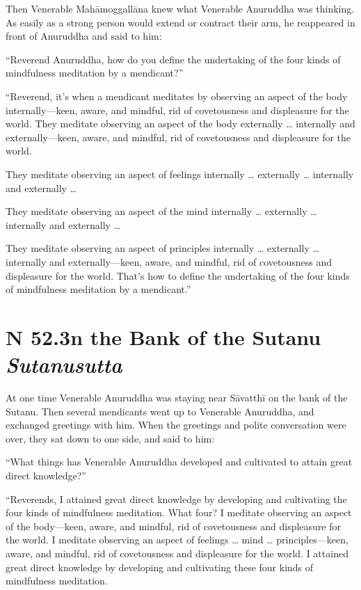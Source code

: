 \documentclass[12pt,openany]{book}%
\newcommand*{\suttatitleacronym}[1]{\smaller[2]{#1}\vspace*{.3em}}
\newcommand*{\suttatitletranslation}[1]{\linebreak{#1}}
\newcommand*{\suttatitleroot}[1]{\linebreak\smaller[2]\itshape{#1}}
\newcommand*{\tocacronym}[1]{\hspace*{-3.3em}{#1}\quad}
\newcommand*{\toctranslation}[1]{#1}
\newcommand*{\tocroot}[1]{(\textit{#1})}
\begin{document}
Then Venerable \textsanskrit{Mahāmoggallāna} knew what Venerable Anuruddha was thinking. As easily as a strong person would extend or contract their arm, he reappeared in front of Anuruddha and said to him: 

“Reverend Anuruddha, how do you define the undertaking of the four kinds of mindfulness meditation by a mendicant?” 

“Reverend, it’s when a mendicant meditates by observing an aspect of the body internally—keen, aware, and mindful, rid of covetousness and displeasure for the world. They meditate observing an aspect of the body externally … internally and externally—keen, aware, and mindful, rid of covetousness and displeasure for the world. 

They meditate observing an aspect of feelings internally … externally … internally and externally … 

They meditate observing an aspect of the mind internally … externally … internally and externally … 

They meditate observing an aspect of principles internally … externally … internally and externally—keen, aware, and mindful, rid of covetousness and displeasure for the world. That’s how to define the undertaking of the four kinds of mindfulness meditation by a mendicant.” 

%
\section*{{\suttatitleacronym SN 52.3}{\suttatitletranslation On the Bank of the Sutanu }{\suttatitleroot Sutanusutta}}
\addcontentsline{toc}{section}{\tocacronym{SN 52.3} \toctranslation{On the Bank of the Sutanu } \tocroot{Sutanusutta}}

At one time Venerable Anuruddha was staying near \textsanskrit{Sāvatthī} on the bank of the Sutanu. Then several mendicants went up to Venerable Anuruddha, and exchanged greetings with him. When the greetings and polite conversation were over, they sat down to one side, and said to him: 

“What things has Venerable Anuruddha developed and cultivated to attain great direct knowledge?” 

“Reverends, I attained great direct knowledge by developing and cultivating the four kinds of mindfulness meditation. What four? I meditate observing an aspect of the body—keen, aware, and mindful, rid of covetousness and displeasure for the world. I meditate observing an aspect of feelings … mind … principles—keen, aware, and mindful, rid of covetousness and displeasure for the world. I attained great direct knowledge by developing and cultivating these four kinds of mindfulness meditation. 
\end{document}
